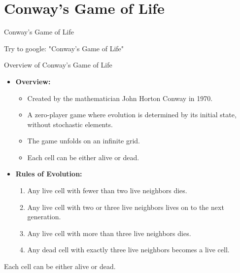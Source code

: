 \section{Conway's Game of Life}
\begin{frame}{Conway's Game of Life}
    \LARGE
    \begin{center}
        Try to google: "Conway's Game of Life"
    \end{center}
\end{frame}

\begin{frame}{Overview of Conway's Game of Life}
\small
\begin{itemize}
    \item \textbf{Overview:}
    \begin{itemize}
        \item Created by the mathematician John Horton Conway in 1970.
        \item A zero-player game where evolution is determined by its initial state, without stochastic elements.
        \item The game unfolds on an infinite grid.
        \item Each cell can be either alive or dead.
    \end{itemize}
    
    \item \textbf{Rules of Evolution:}
    \begin{enumerate}
        \item Any live cell with fewer than two live neighbors dies.
        \item Any live cell with two or three live neighbors lives on to the next generation.
        \item Any live cell with more than three live neighbors dies.
        \item Any dead cell with exactly three live neighbors becomes a live cell.
    \end{enumerate}
\end{itemize}
\end{frame}

\begin{frame}{Each cell can be either alive or dead.}
    \vfill
    \begin{center}
    \end{center}
\end{frame}

